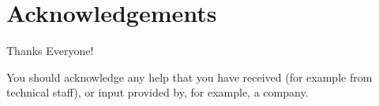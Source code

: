 \newpage
\onehalfspacing\raggedright %

\section*{\Huge{Acknowledgements}}
Thanks Everyone!

You should acknowledge any help that you have received (for example from technical staff), or input provided by, for example, a company.